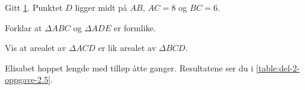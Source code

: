 \begin{figure}[H]
  \caption{}
  \label{fig:Forkurs-1p-2p-laererutdanning-2017-V-oppgave-2-4}
\end{figure}

Gitt \cref{fig:Forkurs-1p-2p-laererutdanning-2017-V-oppgave-2-4}. Punktet $D$
ligger midt på $AB$, $AC=8$ og $BC=6$.

\begin{oppgaver}
   Forklar at $\Delta ABC$ og $\Delta ADE$ er formlike.
\end{oppgaver}

\begin{oppgaver}
   Vis at arealet av $\Delta ACD$ er lik arealet av $\Delta BCD$.
\end{oppgaver}


\Oppgave[3] %

Elisabet hoppet lengde med tilløp åtte ganger. Resultatene ser du i
\cref{table:del-2-oppgave-2.5}. \medskip

